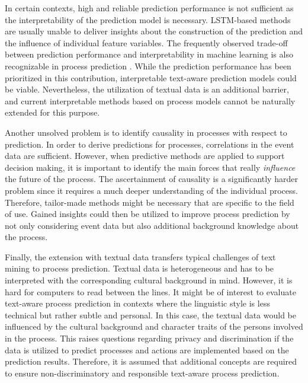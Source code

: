 In certain contexts, high and reliable prediction performance is not sufficient as the interpretability of the prediction model is necessary.
LSTM-based methods are usually unable to deliver insights about the construction of the prediction and the influence of individual feature variables.
The frequently observed trade-off between prediction performance and interpretability in machine learning is also recognizable in process prediction \cite{DBLP:journals/sosym/TaxTZ20}.
While the prediction performance has been prioritized in this contribution, interpretable text-aware prediction models could be viable.
Nevertheless, the utilization of textual data is an additional barrier, and current interpretable methods based on process models cannot be naturally extended for this purpose.

Another unsolved problem is to identify causality in processes with respect to prediction.
In order to derive predictions for processes, correlations in the event data are sufficient.
However, when predictive methods are applied to support decision making, it is important to identify the main forces that really \textit{influence} the future of the process.
The ascertainment of causality is a significantly harder problem since it requires a much deeper understanding of the individual process.
Therefore, tailor-made methods might be necessary that are specific to the field of use.
Gained insights could then be utilized to improve process prediction by not only considering event data but also additional background knowledge about the process.

Finally, the extension with textual data transfers typical challenges of text mining to process prediction.
Textual data is heterogeneous and has to be interpreted with the corresponding cultural background in mind.
However, it is hard for computers to read between the lines.
It might be of interest to evaluate text-aware process prediction in contexts where the linguistic style is less technical but rather subtle and personal.
In this case, the textual data would be influenced by the cultural background and character traits of the persons involved in the process.
This raises questions regarding privacy and discrimination if the data is utilized to predict processes and actions are implemented based on the prediction results.
Therefore, it is assumed that additional concepts are required to ensure non-discriminatory and responsible text-aware process prediction.